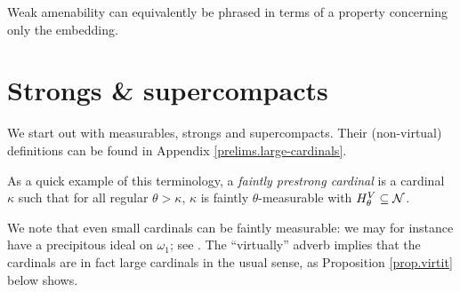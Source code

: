 \documentclass[../../main]{subfiles}
\begin{document}
Weak amenability can equivalently be phrased in terms of a property concerning only the embedding.


\section{Strongs \& supercompacts}

We start out with measurables, strongs and supercompacts. Their (non-virtual) definitions can be found in Appendix \ref{prelims.large-cardinals}.


As a quick example of this terminology, a \textit{faintly prestrong cardinal} is a cardinal $\kappa$ such that for all regular $\theta>\kappa$, $\kappa$ is faintly $\theta$-measurable with $H_\theta^V\subseteq\operatorname{\mathcal N}$.

\qquad We note that even small cardinals can be faintly measurable: we may for instance have a precipitous ideal on $\omega_1$; see \cite[Theorem 22.33]{Jech}. The ``virtually'' adverb implies that the cardinals are in fact large cardinals in the usual sense, as Proposition \ref{prop.virtit} below shows.
\end{document}
